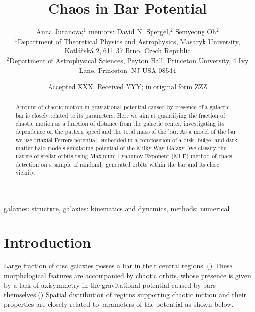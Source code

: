 \documentclass[a4paper,fleqn,usenatbib]{mnras}
\title[Short title, max. 45 characters]{Chaos in Bar Potential}
\author[A. Juranova et al.]{
Anna Juranova;$^{1}$ %
mentors: David N. Spergel,$^{2}$
Semyeong Oh$^{2}$
\\
$^{1}$Department of Theoretical Physics and Astrophysics, Masaryk University, Kotl\'a\v{r}sk\'a 2, 611 37 Brno, Czech Republic\\ %
$^{2}$Department of Astrophysical Sciences, Peyton Hall, Princeton University, 4 Ivy Lane, Princeton, NJ USA 08544\\
}
\date{Accepted XXX. Received YYY; in original form ZZZ}
\begin{document}
\label{firstpage}
\pagerange{\pageref{firstpage}--\pageref{lastpage}}
\maketitle

\begin{abstract}
Amount of chaotic motion in graviational potential caused by presence of a galactic bar is closely related to its parameters. Here we aim at quantifying the fraction of chaotic motion as a function of distance from the galactic center, investigating its dependence on the pattern speed and the total mass of the bar. As a model of the bar we use triaxial Ferrers potential, embedded in a composition of a disk, bulge, and dark matter halo models simulating potential of the Milky Way Galaxy. We classify the nature of stellar orbits using Maximum Lyapunov Exponent (MLE) method of chaos detection on a sample of randomly generated orbits within the bar and its close vicinity.\\

\end{abstract}

\begin{keywords}
galaxies: structure, galaxies: kinematics and dynamics, methods: numerical
\end{keywords}



\section{Introduction}

Large fraction of disc galaxies posses a bar in their central regions. (\cite{Spitzgal:2015}) These morphological features are accompanied by chaotic orbits, whose presence is given by a lack of axisymmetry in the gravitational potential caused by bars themselves.(\cite{BinneyTremaine:2008}) Spatial distribution of regions supporting chaotic motion and their properties are closely related to parameters of the potential as shown below.
\end{document}
